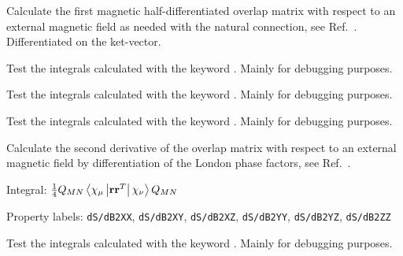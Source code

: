 \begin{description}

\item[\Key{S1MAGR}] Calculate the first magnetic half-differentiated overlap
matrix with respect to an external magnetic field as needed with the
natural connection, see Ref.~\cite{krthklbpjjocp195}. Differentiated on
the ket-vector.


\item[\Key{S1MAGT}] Test the integrals calculated with the keyword
. Mainly for debugging purposes.

\item[\Key{S1MLT}] Test the integrals calculated with the keyword
. Mainly for debugging purposes.

\item[\Key{S1MRT}] Test the integrals calculated with the keyword
. Mainly for debugging purposes.

\item[\Key{S2MAG}] Calculate the second derivative of the overlap
matrix with respect to an external magnetic field by differentiation
of the London phase factors, see Ref.~\cite{thpjjcp95}.

\begin{list}{}{}
\item Integral: $\frac{1}{4}Q_{MN}\left<\chi_{\mu}\left|{\bf r}{\bf
r}^{T}\right|\chi_{\nu}\right>Q_{MN}$
\item Property labels: \verb|dS/dB2XX|, \verb|dS/dB2XY|,
\verb|dS/dB2XZ|, \verb|dS/dB2YY|, \verb|dS/dB2YZ|, \verb|dS/dB2ZZ|
\end{list}

\item[\Key{S2MAGT}] Test the integrals calculated with the keyword
. Mainly for debugging purposes.


\end{description}
